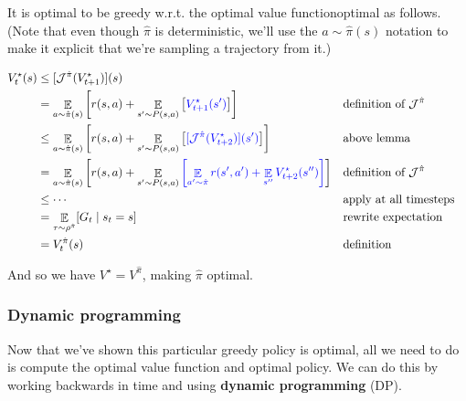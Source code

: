 \documentclass[../main/main]{subfiles}
\begin{document}
\begin{theorem}{It is optimal to be greedy w.r.t. the optimal value function}{optimal}
    as follows. (Note that even though $\hat \pi$ is deterministic, we'll use the $a \sim \hat \pi(s)$ notation to make it explicit that we're sampling a trajectory from it.)
    
    \begin{align*}
    V_{t}^{\star}(s) &\le [\mathcal{J}^{\hat \pi}(V_{t+1}^{\star})](s) \\
    &= \mathop{\mathbb{E}}_{a \sim \hat \pi(s)} \left[ r(s, a) + \mathop{\mathbb{E}}_{s' \sim P(s, a)} \left[ {\color{blue} V_{t+1}^{\star}(s')} \right] \right] && \text{definition of } \mathcal{J}^{\hat \pi} \\
    &\le \mathop{\mathbb{E}}_{a \sim \hat \pi(s)} \left[ r(s, a) + \mathop{\mathbb{E}}_{s' \sim P(s, a)} \left[ {\color{blue}[ \mathcal{J}^{\hat \pi} (V_{t+2}^{\star})] (s')} \right] \right] && \text{above lemma} \\
    &= \mathop{\mathbb{E}}_{a \sim \hat \pi(s)} \left[ r(s, a) + \mathop{\mathbb{E}}_{s' \sim P(s, a)}{\color{blue} \left[ \mathop{\mathbb{E}}_{a' \sim \hat \pi}  r(s', a') + \mathop{\mathbb{E}}_{s''} V_{t+2}^{\star}(s'') \right]} \right] && \text{definition of } \mathcal{J}^{\hat \pi} \\
    &\le \cdots && \text{apply at all timesteps} \\
    &= \mathop{\mathbb{E}}_{\tau \sim \rho^{\hat \pi}} [G_{t} \mid s_t = s] && \text{rewrite expectation} \\
    &= V_{t}^{\hat \pi}(s) && \text{definition}
    \end{align*}

    And so we have $V^{\star} = V^{\hat \pi}$, making $\hat \pi$ optimal.
\end{theorem}


\subsubsection{Dynamic programming}

Now that we've shown this particular greedy policy is optimal, all we need to do is compute the optimal value function and optimal policy. We can do this by working backwards in time and using \textbf{dynamic programming} (DP).
\end{document}
